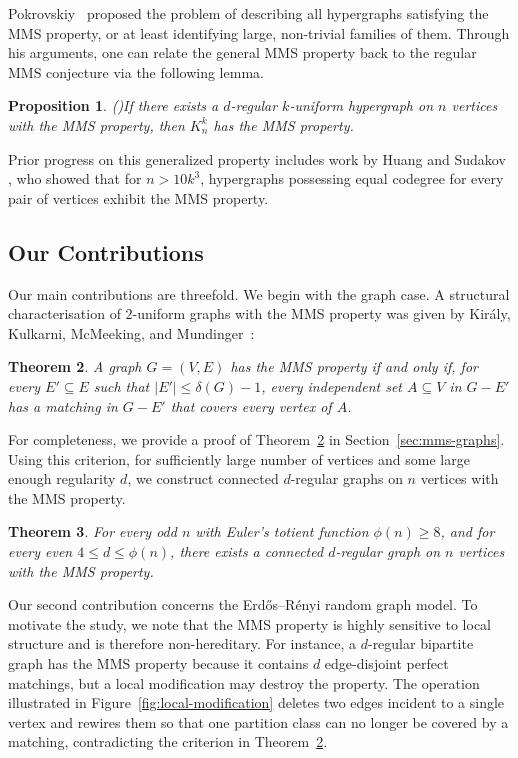 \documentclass[12pt,UKenglish]{amsart}
\newtheorem{thm}{Theorem}[section]
\theoremstyle{plain}
\newtheorem{prop}[thm]{Proposition}
\theoremstyle{definition}
\theoremstyle{remark}
\begin{document}
Pokrovskiy~\cite{POKROVSKIY2015280} proposed the problem of describing all hypergraphs satisfying the MMS property, or at least identifying large, non-trivial families of them. Through his arguments, one can relate the general MMS property back to the regular MMS conjecture via the following lemma.
\begin{prop}(\cite{POKROVSKIY2015280})\label{prop:pokrovskiy}
If there exists a $d$-regular $k$-uniform hypergraph on $n$ vertices with the MMS property, then $K_n^k$ has the MMS property. 
\end{prop}
Prior progress on this generalized property includes work by Huang and Sudakov \cite{huang2013minimum}, who showed that for $n > 10k^3$, hypergraphs possessing equal codegree for every pair of vertices exhibit the MMS property.

\subsection*{Our Contributions}

Our main contributions are threefold. We begin with the graph case. A structural characterisation of $2$-uniform graphs with the MMS property was given by Kir\'aly, Kulkarni, McMeeking, and Mundinger~\cite{kiraly2018manickammiklossinghiparametergraphsdegree}:

\begin{thm}\label{thm:graph-characterisation}
  A graph $G=(V,E)$ has the MMS property if and only if, for every $E' \subseteq E$ such that $|E'| \le \delta(G)-1$, every independent set $A \subseteq V$ in $G-E'$ has a matching in $G-E'$ that covers every vertex of $A$.
\end{thm}
For completeness, we provide a proof of Theorem~\ref{thm:graph-characterisation} in Section~\ref{sec:mms-graphs}. Using this criterion, for sufficiently large number of vertices and some large enough regularity $d$, we construct connected $d$-regular graphs on $n$ vertices with the MMS property.

\begin{thm}\label{thm:regular-existence}
  For every odd  $n$ with Euler's totient function $\phi(n) \ge 8$, and for every even  $4 \le d \le \phi(n)$, there exists a connected $d$-regular graph on $n$ vertices with the MMS property.
\end{thm}

Our second contribution concerns the Erd\H{o}s--R\'enyi random graph model. To motivate the study, we note that the MMS property is highly sensitive to local structure and is therefore non-hereditary. For instance, a $d$-regular bipartite graph has the MMS property because it contains $d$ edge-disjoint perfect matchings, but a local modification may destroy the property. The operation illustrated in Figure~\ref{fig:local-modification} deletes two edges incident to a single vertex and rewires them so that one partition class can no longer be covered by a matching, contradicting the criterion in Theorem~\ref{thm:graph-characterisation}.
\end{document}
